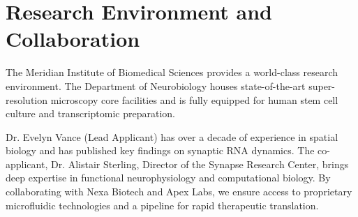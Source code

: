 \section{Research Environment and Collaboration}

The Meridian Institute of Biomedical Sciences provides a world-class research environment. The Department of Neurobiology houses state-of-the-art super-resolution microscopy core facilities and is fully equipped for human stem cell culture and transcriptomic preparation.

Dr. Evelyn Vance (Lead Applicant) has over a decade of experience in spatial biology and has published key findings on synaptic RNA dynamics. The co-applicant, Dr. Alistair Sterling, Director of the Synapse Research Center, brings deep expertise in functional neurophysiology and computational biology. By collaborating with Nexa Biotech and Apex Labs, we ensure access to proprietary microfluidic technologies and a pipeline for rapid therapeutic translation.

